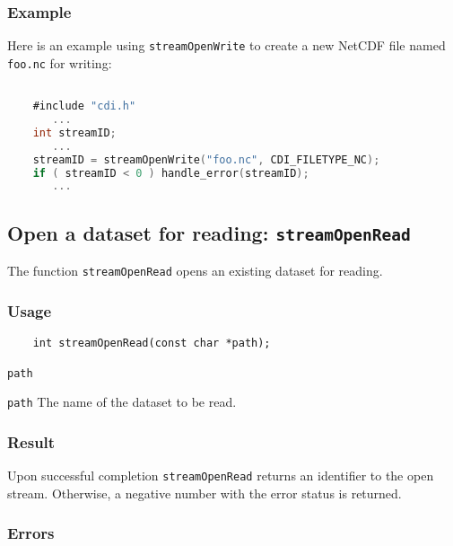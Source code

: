 \subsubsection*{Example}

Here is an example using {\texttt{streamOpenWrite}} to create a new NetCDF file named {\texttt{foo.nc}} for writing:

\begin{lstlisting}[language=C, backgroundcolor=\color{pyellow}, basicstyle=\small, columns=flexible]

    #include "cdi.h"
       ...
    int streamID;
       ...
    streamID = streamOpenWrite("foo.nc", CDI_FILETYPE_NC);
    if ( streamID < 0 ) handle_error(streamID);
       ...
\end{lstlisting}


\subsection{Open a dataset for reading: \texttt{streamOpenRead}}
\label{streamOpenRead}

The function {\texttt{streamOpenRead}} opens an existing dataset for reading.

\subsubsection*{Usage}

\begin{verbatim}
    int streamOpenRead(const char *path);
\end{verbatim}

\hspace*{4mm}\begin{minipage}[]{15cm}
\begin{deflist}{\texttt{path}\ }
\item[\texttt{path}]
The name of the dataset to be read.

\end{deflist}
\end{minipage}

\subsubsection*{Result}

Upon successful completion {\texttt{streamOpenRead}} returns an identifier to the
open stream. Otherwise, a negative number with the error status is returned.


\subsubsection*{Errors}


